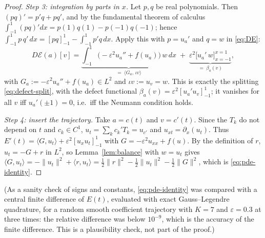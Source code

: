 \begin{proof}
\emph{Step 3: integration by parts in $x$.}
Let $p,q$ be real polynomials. Then $(pq)'=p'q+pq'$, and by the fundamental theorem of calculus $\int_{-1}^{1}(pq)'dx=p(1)q(1)-p(-1)q(-1)$; hence $\int_{-1}^{1}p\,q'\,dx=[pq]_{-1}^{1}-\int_{-1}^{1}p'q\,dx$.
Apply this with $p=u_a'$ and $q=w$ in \eqref{eq:DE}:
\begin{equation}\label{eq:DE-split}
D\mathcal{E}(a)[v]=\underbrace{\int_{-1}^{1}\bigl(-\varepsilon^2u_a''+f(u_a)\bigr)\,w\,dx}_{=\ \langle G_a,\,\iota v\rangle}\;+\;\underbrace{\varepsilon^2\bigl[u_a'\,w\bigr]_{x=-1}^{x=1}}_{=\ \beta_a(v)},
\end{equation}
with $G_a:=-\varepsilon^2u_a''+f(u_a)\in L^2$ and $\iota v:=u_v=w$.
This is exactly the splitting \eqref{eq:defect-split}, with the defect functional $\beta_a(v)=\varepsilon^2[u_a'u_v]_{-1}^{1}$; it vanishes for all $v$ iff $u_a'(\pm1)=0$, i.e.\ iff the Neumann condition holds.

\emph{Step 4: insert the trajectory.}
Take $a=c(t)$ and $v=c'(t)$. Since the $T_k$ do not depend on $t$ and $c_k\in C^1$, $u_t=\sum_kc_k'T_k=u_{c'}$ and $u_{xt}=\partial_x(u_t)$.
Thus $E'(t)=\langle G,u_t\rangle+\varepsilon^2[u_xu_t]_{-1}^{1}$ with $G=-\varepsilon^2u_{xx}+f(u)$.
By the definition of $r$, $u_t=-G+r$ in $L^2$, so Lemma~\ref{lem:balance} with $w=u_t$ gives $\langle G,u_t\rangle=-\|u_t\|^2+\langle r,u_t\rangle=\frac12\|r\|^2-\frac12\|u_t\|^2-\frac12\|G\|^2$, which is \eqref{eq:pde-identity}.
\end{proof}

(As a sanity check of signs and constants, \eqref{eq:pde-identity} was compared with a central finite difference of $E(t)$, evaluated with exact Gauss--Legendre quadrature, for a random smooth coefficient trajectory with $K=7$ and $\varepsilon=0.3$ at three times: the relative difference was below $10^{-9}$, which is the accuracy of the finite difference. This is a plausibility check, not part of the proof.)

